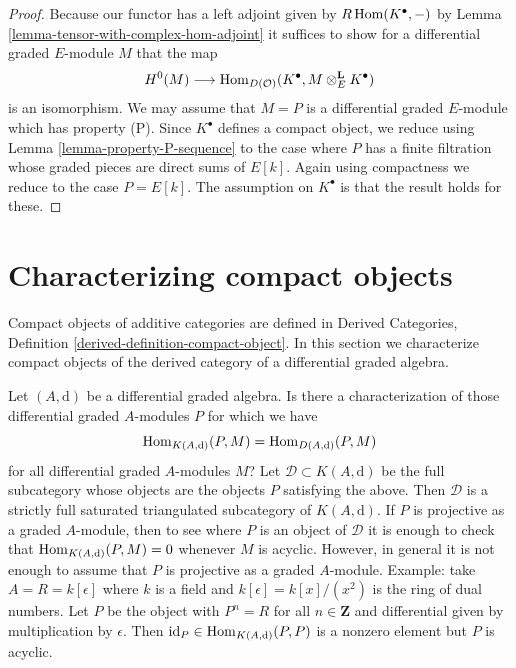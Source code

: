 \begin{proof}
Because our functor has a left adjoint given by
$R\mathop{\mathrm{Hom}}\nolimits(K^\bullet, -)$ by Lemma \ref{lemma-tensor-with-complex-hom-adjoint}
it suffices to show for a differential graded $E$-module $M$ that the map
$$
H^0(M) \longrightarrow
\mathop{\mathrm{Hom}}\nolimits_{D(\mathcal{O})}(K^\bullet, M \otimes_E^\mathbf{L} K^\bullet)
$$
is an isomorphism. We may assume that $M = P$ is a differential graded
$E$-module which has property (P). Since $K^\bullet$ defines a
compact object, we reduce using
Lemma \ref{lemma-property-P-sequence}
to the case where $P$ has a finite filtration whose graded pieces
are direct sums of $E[k]$. Again using compactness we reduce
to the case $P = E[k]$. The assumption on $K^\bullet$ is that
the result holds for these.
\end{proof}











\section{Characterizing compact objects}
\label{section-compact}

\noindent
Compact objects of additive categories are defined in
Derived Categories, Definition \ref{derived-definition-compact-object}.
In this section we characterize compact objects of the derived
category of a differential graded algebra.

\begin{remark}
\label{remark-source-graded-projective}
Let $(A, \text{d})$ be a differential graded algebra. Is there a
characterization of those differential graded $A$-modules $P$
for which we have
$$
\mathop{\mathrm{Hom}}\nolimits_{K(A, \text{d})}(P, M) =  \mathop{\mathrm{Hom}}\nolimits_{D(A, \text{d})}(P, M)
$$
for all differential graded $A$-modules $M$? Let
$\mathcal{D} \subset K(A, \text{d})$ be the full subcategory
whose objects are the objects $P$ satisfying the above. Then $\mathcal{D}$
is a strictly full saturated triangulated subcategory of $K(A, \text{d})$.
If $P$ is projective as a graded $A$-module, then to see where $P$
is an object of $\mathcal{D}$ it is enough to check that
$\mathop{\mathrm{Hom}}\nolimits_{K(A, \text{d})}(P, M) = 0$ whenever $M$ is acyclic.
However, in general it is not enough to assume that $P$ is projective as
a graded $A$-module. Example: take $A = R = k[\epsilon]$ where $k$ is
a field and $k[\epsilon] = k[x]/(x^2)$ is the ring of dual numbers.
Let $P$ be the object with $P^n = R$ for all $n \in \mathbf{Z}$
and differential given by multiplication by $\epsilon$. Then
$\text{id}_P \in \mathop{\mathrm{Hom}}\nolimits_{K(A, \text{d})}(P, P)$ is a nonzero element
but $P$ is acyclic.
\end{remark}

